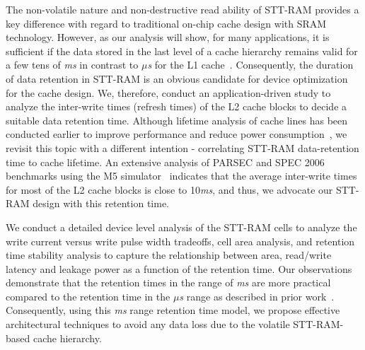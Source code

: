The non-volatile nature and non-destructive read ability of STT-RAM provides a key difference with
regard to traditional on-chip cache design with SRAM technology. However, as our analysis will show,
for many applications, it is sufficient if the data stored in the last level of a cache hierarchy
remains valid for a few tens of {\it ms} in contrast to {\it $\mu$s} for the L1 cache~\cite{3t1d-cache}.
Consequently, the duration of data retention in STT-RAM
is an obvious candidate for device optimization for the cache design. We, therefore, conduct an
application-driven study to analyze the inter-write times (refresh times) of the L2 cache blocks to decide a suitable
data retention time. Although lifetime analysis of cache lines has been conducted earlier to
improve performance and reduce power consumption~\cite{cache-decay-2001,3t1d-cache}, we revisit this
topic with a different intention - correlating STT-RAM data-retention time to cache lifetime. An
extensive analysis of PARSEC and SPEC 2006 benchmarks using the M5 simulator~\cite{M5} indicates that
the average inter-write times for most of the L2 cache blocks is close to 10{\it ms}, and thus, we advocate
our STT-RAM design with this retention time.

We conduct a detailed device level analysis of the STT-RAM cells to analyze the write current versus
write pulse width tradeoffs, cell area analysis, and retention time stability analysis to capture the
relationship between area, read/write latency and leakage power as a function of the retention time. Our observations demonstrate that the retention times in the range of {\it ms} are more practical compared to the retention time in the
{\it $\mu$s} range as described in prior work~\cite{STTRAM:HPCA11}. Consequently, using this {\it ms} range retention time model, we propose effective
architectural techniques to avoid any data loss due to the volatile STT-RAM-based cache hierarchy.


